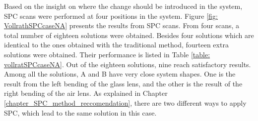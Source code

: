Based on the insight on where the change should be introduced in the system, SPC scans were performed at four positions in the system. Figure \ref{fig: VollrathSPCcaseNA} presents the results from SPC scans. From four scans, a total number of eighteen solutions were obtained. Besides four solutions which are identical to the ones obtained with the traditional method, fourteen extra solutions were obtained. Their performance is listed in Table \ref{table: vollratSPCcaseNA}. Out of the eighteen solutions, nine reach satisfactory results. Among all the solutions, A and B have very close system shapes. One is the result from the left bending of the glass lens, and the other is the result of the right bending of the air lens. As explained in Chapter \ref{chapter_SPC_method_reccomendation}, there are two different ways to apply SPC, which lead to the same solution in this case.

\begin{figure}
\end{figure}

